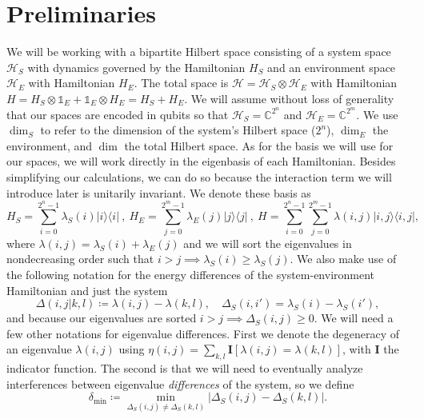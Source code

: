 \documentclass{article}
\newcommand{\ketbra}[2]{| #1\rangle\! \langle #2|}
\newcommand{\hilb}{\mathcal{H}}
\newcommand{\identity}{\mathds{1}}
\begin{document}
\section{Preliminaries} \label{sec:prelim}
We will be working with a bipartite Hilbert space consisting of a system space $\hilb_S$ with dynamics governed by the Hamiltonian $H_S$ and an environment space $\hilb_E$ with Hamiltonian $H_E$. The total space is $\hilb = \hilb_S \otimes \hilb_E$ with Hamiltonian $H = H_S \otimes \identity_E + \identity_E \otimes H_E = H_S + H_E$. We will assume without loss of generality that our spaces are encoded in qubits so that $\hilb_S = \mathbb{C}^{2^n}$ and $\hilb_E = \mathbb{C}^{2^m}$. We use $\dim_S$ to refer to the dimension of the system's Hilbert space ($2^n$), $\dim_E$ the environment, and $\dim$ the total Hilbert space. As for the basis we will use for our spaces, we will work directly in the eigenbasis of each Hamiltonian. Besides simplifying our calculations, we can do so because the interaction term we will introduce later is unitarily invariant. We denote these basis as
\begin{equation}
    H_{S} = \sum_{i = 0}^{2^n - 1} \lambda_S(i) \ketbra{i}{i} ~,~ H_{E} = \sum_{j=0}^{2^m - 1} \lambda_E(j) \ketbra{j}{j} ~,~ H = \sum_{i=0}^{2^n - 1} \sum_{j=0}^{2^m - 1} \lambda(i,j) \ketbra{i,j}{i,j},
\end{equation}
where $\lambda(i,j) = \lambda_S(i) + \lambda_E(j)$ and we will sort the eigenvalues in nondecreasing order such that $i > j \implies \lambda_S(i) \geq \lambda_S(j)$. We also make use of the following notation for the energy differences of the system-environment Hamiltonian and just the system
\begin{equation}
\Delta(i,j|k,l) \coloneqq \lambda(i,j) - \lambda(k,l), \quad \Delta_S(i,i') = \lambda_S(i) - \lambda_S(i'), \label{eq:delta_def}
\end{equation}
and because our eigenvalues are sorted $i > j \implies \Delta_S(i,j) \geq 0$. We will need a few other notations for eigenvalue differences. First we denote the degeneracy of an eigenvalue $\lambda(i,j)$ using $\eta(i,j) = \sum_{k, l} \mathbf{I}[\lambda(i,j) = \lambda(k,l)]$, with $\mathbf{I}$ the indicator function. The second is that we will need to eventually analyze interferences between eigenvalue \emph{differences} of the system, so we define
\begin{equation}
    \delta_{\min} \coloneqq \min_{\Delta_S(i,j) \neq \Delta_S(k,l)} \left| \Delta_S(i,j) - \Delta_S(k, l) \right|. \label{eq:delta_min_def}
\end{equation}
\end{document}
